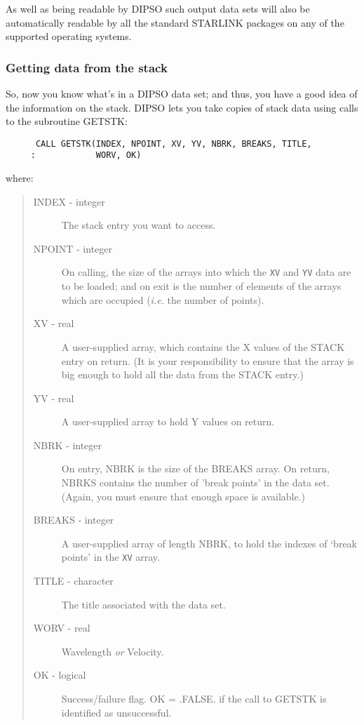 As well as being readable by DIPSO such output data sets will also be
automatically readable by all the standard STARLINK packages on any
of the supported operating systems.

\subsubsection {Getting data from the stack}

So, now you know what's in a DIPSO data set; and thus, you have a good
idea of the information on the stack. DIPSO lets you take copies of
stack data using calls to the subroutine GETSTK:

\begin{verbatim}
      CALL GETSTK(INDEX, NPOINT, XV, YV, NBRK, BREAKS, TITLE,
     :            WORV, OK)
\end{verbatim}

where:

\begin{quote}
\begin{description}

\item [INDEX - integer] The stack entry you want to access.

\item [NPOINT - integer] On calling, the size of the arrays into which the 
{\tt{XV}}  and {\tt{YV}}  data are to be loaded; and on exit is the
number of elements of the arrays which are occupied ({\em i.e.} the
number of points).

\item [XV - real] A user-supplied array, which contains the X values
of the STACK entry on return. (It is your responsibility to ensure
that the array is big enough to hold all the data from the STACK
entry.)

\item [YV - real] A user-supplied array to hold Y values on return.

\item [NBRK - integer] On entry, NBRK is the size of the BREAKS
array. On return, NBRKS contains the number of 'break points' in the
data set. (Again, you must ensure that enough space is available.)

\item [BREAKS - integer] A user-supplied array of length NBRK, to
hold the indexes of `break points' in the {\tt{XV}}  array.

\item [TITLE - character] The title associated with the data set.

\item [WORV - real] Wavelength {\em or} Velocity.

\item [OK - logical] Success/failure flag. OK = .FALSE. if the
call to GETSTK is identified as unsuccessful.

\end{description}
\end{quote}

